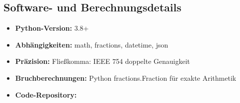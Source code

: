 	\subsection{Software- und Berechnungsdetails}
	
	\begin{itemize}
		\item \textbf{Python-Version:} 3.8+
		\item \textbf{Abhängigkeiten:} math, fractions, datetime, json
		\item \textbf{Präzision:} Fließkomma: IEEE 754 doppelte Genauigkeit
		\item \textbf{Bruchberechnungen:} Python fractions.Fraction für exakte Arithmetik
		\item \textbf{Code-Repository:} 
	\end{itemize}

